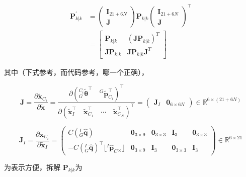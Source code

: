 \documentclass[12pt,a4paper]{article}
\begin{document}
\begin{equation}
\begin{aligned}
\mathbf{P}_{k|k}^{\prime}
&= 
\begin{pmatrix}
\mathbf{I}_{21+6N} \\ \mathbf{J}
\end{pmatrix}
\mathbf{P}_{k|k}
\begin{pmatrix}
\mathbf{I}_{21+6N} \\ \mathbf{J}
\end{pmatrix}^\top \\
&=
\begin{bmatrix}
\mathbf{P}_{k|k} & (\mathbf{J} \mathbf{P}_{k|k})^T \\
\mathbf{J} \mathbf{P}_{k|k} & \mathbf{J} \mathbf{P}_{k|k} \mathbf{J}^T
\end{bmatrix}
\end{aligned}
\end{equation}

其中（下式参考\citep{sun2018robust}，而代码参考\cite{mourikis2007multi}，{\color{red}哪一个正确}），

\begin{equation*}
\mathbf{J} = 
\frac{\partial{\tilde{\mathbf{x}}_{C_i}}}{\partial{\tilde{\mathbf{x}}}} = 
\frac{
\partial{\left(
{}^{C_i}_G\tilde{\boldsymbol{\theta}}^\top \quad
{}^G\tilde{\mathbf{p}}_{C_i}^\top
\right)^\top}}
{\partial{\left(
\tilde{\mathbf{x}}_I^\top \quad
\tilde{\mathbf{x}}_{C_1}^\top \quad
\cdots \quad 
\tilde{\mathbf{x}}_{C_N}^\top
\right)^\top}} = 
\begin{pmatrix}
\mathbf{J}_I & \mathbf{0}_{6\times 6N}
\end{pmatrix}
\in \mathbb{R}^{6 \times (21+6N)}
\end{equation*}

\begin{equation*}
\mathbf{J}_I = 
\frac{\partial{\tilde{\mathbf{x}}_{C_i}}}{\partial{\tilde{\mathbf{x}}_I}} = 
\begin{pmatrix}
C\left({}^I_G\hat{\mathbf{q}}\right) & \mathbf{0}_{3\times 9} & 
\mathbf{0}_{3\times 3} & \mathbf{I}_3 & \mathbf{0}_{3\times 3} \\
-C\left({}^I_G\hat{\mathbf{q}}\right)^\top \lfloor{}^I\hat{\mathbf{p}}_C {}_{\times}\rfloor & 
\mathbf{0}_{3\times 9} & \mathbf{I}_3 & \mathbf{0}_{3\times 3} & 
\mathbf{I}_{3}
\end{pmatrix}
\in \mathbb{R}^{6 \times 21}
\end{equation*}

为表示方便，拆解 $\mathbf{P}_{k|k}$为
\end{document}

